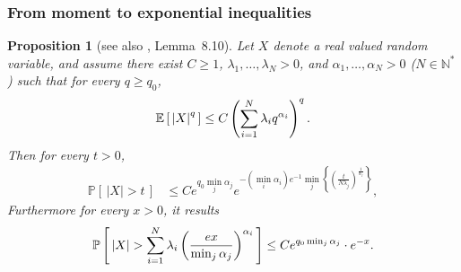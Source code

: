 \documentclass[twoside,11pt]{article}
\numberwithin{equation}{section}
\newtheorem{prop}{Proposition}[section]
\newcommand{\1}{\mathds{1}}%
\newcommand{\paren}[1]{\left( #1 \right)}
\newcommand{\croch}[1]{\left[\, #1 \,\right]}
\newcommand{\acc}[1]{\left\{ #1 \right\}}
\newcommand{\abs}[1]{\left\lvert #1 \right\rvert} %
\newcommand{\N}{\mathbb{N}}
\newcommand{\E}{\mathbb{E}}
\renewcommand{\P}{\mathbb{P}}
\numberwithin{equation}{section}
\theoremstyle{plain}
\begin{document}
\subsubsection{From moment to exponential inequalities}

\begin{prop}[see also \cite{Arl:2007:phd}, Lemma~8.10]
\label{prop.moment.exponential}
%
  Let $X$ denote a real valued random variable, and assume there exist $C\geq 1$, $\lambda_1,\ldots,\lambda_N>0$, and $\alpha_1,\ldots,\alpha_N>0$ ($N\in\N^*$) such that for every $q\geq q_0$,
\begin{align*}
  \E\croch{ \abs{X}^q } \leq C \paren{ \sum_{i=1}^N \lambda_i q^{\alpha_i} }^q . \hfill
\end{align*}
%
Then for every $t>0$,
\begin{eqnarray}\label{ineq.moment.exponential.deviation}
  \P\croch{  \abs{X} >t }
& \leq C e^{q_0 \min_j \alpha_j} e^{ - (\min_i \alpha_i )  e^{-1} \min_j\acc{ \paren{\frac{t}{N \lambda_j}}^{\frac{1}{\alpha_j}} } } ,
\end{eqnarray}
%
Furthermore for every $x>0$, it results
\begin{eqnarray}\label{ineq.moment.exponential.error}
  \P\croch{ \abs{X} > \sum_{i=1}^N \lambda_i \paren{ \frac{e x }{\min_j \alpha_j} }^{\alpha_i} } \leq C e^{q_0 \min_j \alpha_j}  \cdot e^{-x} . \hfill
\end{eqnarray}

\end{prop}

\medskip
\end{document}
